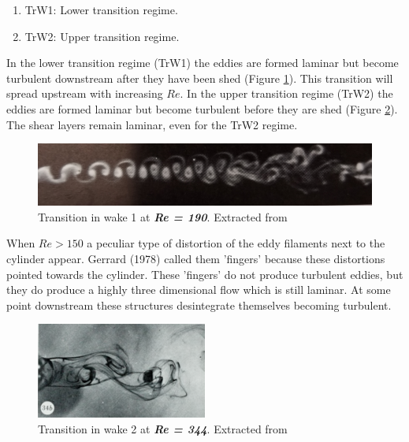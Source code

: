 \documentclass[journal]{new-aiaa}
\begin{document}
\begin{enumerate}[label=(\roman*)]
\item TrW1: Lower transition regime.
\item TrW2: Upper transition regime.
\end{enumerate}

In the lower transition regime (TrW1) the eddies are formed laminar but become turbulent downstream after they have been shed (Figure \ref{fig:TrW1}). This transition will spread upstream with increasing $Re$. In the upper transition regime (TrW2) the eddies are formed laminar but become turbulent before they are shed (Figure \ref{fig:TrW2}). The shear layers remain laminar, even for the TrW2 regime.

\begin{figure}[H]
\begin{center}
\includegraphics[width=1\textwidth]{Images/federico/Figure03}
\caption{Transition in wake 1 at \textbf{\textit{Re = 190}}. Extracted from \cite{Zdravkovich1968} }
\label{fig:TrW1}
\end{center}
\end{figure}

When $Re>150$ a peculiar type of distortion of the eddy filaments next to the cylinder appear. Gerrard (1978) \cite{Gerrard1978} called them 'fingers' because these distortions pointed towards the cylinder. These 'fingers' do not produce turbulent eddies, but they do produce a highly three dimensional flow which is still laminar. At some point downstream these structures desintegrate themselves becoming turbulent. 


\begin{figure}[H]
\begin{center}
\includegraphics[width=0.5\textwidth]{Images/federico/Figure04}
\caption{Transition in wake 2 at \textbf{\textit{Re = 344}}. Extracted from \cite{Gerrard1978} }
\label{fig:TrW2}
\end{center}
\end{figure}
\end{document}

